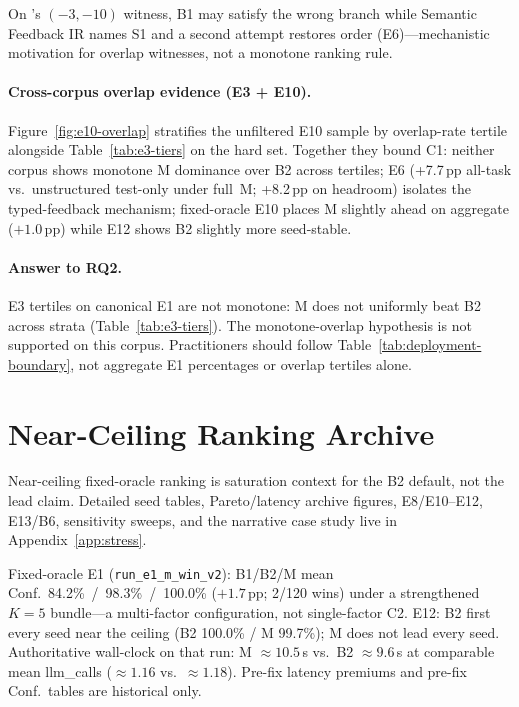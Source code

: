 On 's $(-3,-10)$ witness, B1 may satisfy the wrong
branch while Semantic Feedback IR names S1 and a second attempt restores order
(E6)---mechanistic motivation for overlap witnesses, not a monotone ranking
rule.

\paragraph{Cross-corpus overlap evidence (E3 + E10).}
Figure~\ref{fig:e10-overlap} stratifies the unfiltered E10 sample by
overlap-rate tertile alongside Table~\ref{tab:e3-tiers} on the hard set.
Together they bound C1: neither corpus shows monotone M dominance over B2
across tertiles; E6 (+7.7\,pp all-task vs.\ unstructured test-only under
full~M; +8.2\,pp on headroom) isolates the typed-feedback mechanism;
fixed-oracle E10 places M slightly ahead on aggregate (${+}1.0$\,pp) while
E12 shows B2 slightly more seed-stable.

\paragraph{Answer to RQ2.}
E3 tertiles on canonical E1 are not monotone: M does not uniformly beat B2
across strata (Table~\ref{tab:e3-tiers}).
The monotone-overlap hypothesis is not supported on this corpus.
Practitioners should follow Table~\ref{tab:deployment-boundary}, not aggregate
E1 percentages or overlap tertiles alone.

\section{Near-Ceiling Ranking Archive}
\label{sec:results:rq5}
\label{sec:results:e1-stress}

Near-ceiling fixed-oracle ranking is saturation context for the B2 default,
not the lead claim.
Detailed seed tables, Pareto/latency archive figures, E8/E10--E12, E13/B6,
sensitivity sweeps, and the  narrative case study live in
Appendix~\ref{app:stress}.

Fixed-oracle E1 (\texttt{run\_e1\_m\_win\_v2}): B1/B2/M mean Conf.\
84.2\%~/~98.3\%~/~100.0\% (${+}1.7$\,pp; 2/120 wins) under a strengthened
$K{=}5$ bundle---a multi-factor configuration, not single-factor C2.
E12: B2 first every seed near the ceiling (B2 100.0\% / M 99.7\%); M does
not lead every seed.
Authoritative wall-clock on that run: M ${\approx}10.5$\,s vs.\ B2
${\approx}9.6$\,s at comparable mean llm\_calls (${\approx}1.16$ vs.\
${\approx}1.18$).
Pre-fix latency premiums and pre-fix Conf.\ tables are historical only.

